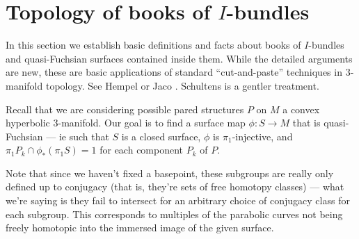 \section{Topology of books of $I$-bundles}

In this section we establish basic definitions and facts about books of
$I$-bundles and quasi-Fuchsian surfaces contained inside them. While the
detailed arguments are new, these are basic applications of standard
``cut-and-paste'' techniques in $3$-manifold topology. See Hempel \cite{He} or
Jaco \cite{Ja}. Schultens \cite{Sch} is a gentler treatment.

Recall that we are considering possible pared structures $P$ on $M$ a convex
hyperbolic $3$-manifold. Our goal is to find a surface map $\phi \colon S \to
M$ that is quasi-Fuchsian --- ie such that $S$ is a closed surface, $\phi$ is
$\pi_1$-injective, and $\pi_1P_k \cap \phi_*(\pi_1S) = 1$ for each component
$P_k$ of $P$.

Note that since we haven't fixed a basepoint, these subgroups are really only
defined up to conjugacy (that is, they're sets of free homotopy classes) ---
what we're saying is they fail to intersect for an arbitrary choice of
conjugacy class for each subgroup. This corresponds to multiples of the
parabolic curves not being freely homotopic into the immersed image of the
given surface.

